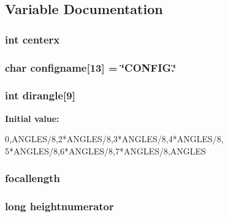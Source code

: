 \subsection{Variable Documentation}
\hypertarget{WL__MAIN_8C_a05f5f2b9130da8655f373530b17559f2}{
\subsubsection[{centerx}]{\setlength{\rightskip}{0pt plus 5cm}int {\bf centerx}}}
\label{WL__MAIN_8C_a05f5f2b9130da8655f373530b17559f2}
\hypertarget{WL__MAIN_8C_af1798aca3dc8c86728240ad581d646f7}{
\subsubsection[{configname}]{\setlength{\rightskip}{0pt plus 5cm}char {\bf configname}\mbox{[}13\mbox{]} = \char`\"{}CONFIG.\char`\"{}}}
\label{WL__MAIN_8C_af1798aca3dc8c86728240ad581d646f7}
\hypertarget{WL__MAIN_8C_a3a80e8be3138f31dfac72bcf50a43d62}{
\subsubsection[{dirangle}]{\setlength{\rightskip}{0pt plus 5cm}int {\bf dirangle}\mbox{[}9\mbox{]}}}
\label{WL__MAIN_8C_a3a80e8be3138f31dfac72bcf50a43d62}
{\bfseries Initial value:}
\begin{DoxyCode}
 {0,ANGLES/8,2*ANGLES/8,3*ANGLES/8,4*ANGLES/8,
        5*ANGLES/8,6*ANGLES/8,7*ANGLES/8,ANGLES}
\end{DoxyCode}
\hypertarget{WL__MAIN_8C_a288677cce66771feddc15ea8cc5c36cc}{
\subsubsection[{focallength}]{ {\bf focallength}}}
\label{WL__MAIN_8C_a288677cce66771feddc15ea8cc5c36cc}
\hypertarget{WL__MAIN_8C_aebfb0db84258aa5fc9301a200f96b8d3}{
\subsubsection[{heightnumerator}]{\setlength{\rightskip}{0pt plus 5cm}long {\bf heightnumerator}}}
